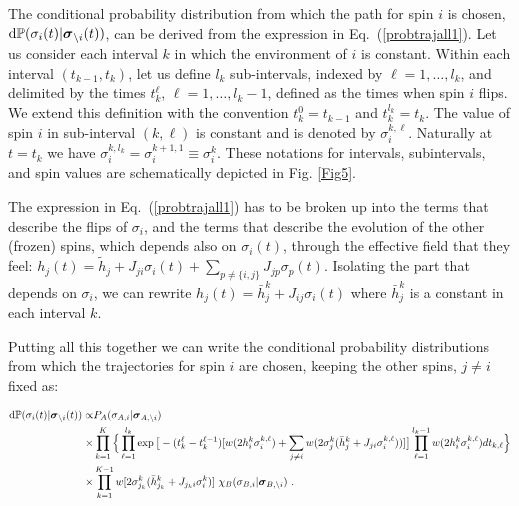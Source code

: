 \documentclass[aps,twocolumn,floats,pre,amsmath,superscriptaddress]{revtex4}
\newcommand{\beq}{\begin{equation}}
\newcommand{\eeq}{\end{equation}}
\newcommand{\<}{\langle}
\renewcommand{\>}{\rangle}
\newcommand{\bs}{ \mbox{\boldmath$\sigma$}}
\begin{document}
The conditional
 probability distribution from which the path for spin $i$ is chosen,
 ${\rm d}\mathbb{P}(\sigma_i(t)|\bs_{\backslash i}(t))$, can be
 derived from the expression in Eq.~(\ref{probtrajall1}).
Let us consider each interval $k$ in which the environment of $i$
is constant. 
Within each interval $(t_{k-1},t_k)$, let us define $l_k$
sub-intervals, indexed by $\ell=1,\ldots,l_k$, and delimited by the times
$t^\ell_k$, $\ell=1,\ldots,l_k-1$, defined as the times when spin $i$ flips. We extend
this definition with the convention $t^0_k=t_{k-1}$ and $t^{l_k}_k=t_k$.
The value of spin $i$ in sub-interval $(k,\ell)$ is constant and is
denoted by $\sigma_i^{k,\ell}$. Naturally at $t=t_k$ we have
$\sigma_i^{k,l_k}=\sigma_i^{k+1,1}\equiv \sigma_i^k $.
These notations for intervals, subintervals, and spin values are schematically depicted in Fig. \ref{Fig5}. 

The expression in  Eq.~(\ref{probtrajall1}) has to be broken up into the terms that describe 
the flips of $\sigma_i$, and the terms that describe the evolution of
the other (frozen) spins, 
which depends also on $\sigma_i(t)$, through the effective field that they feel: 
$h_j(t)=\tilde h_j+J_{ji}\sigma_i(t)+\sum_{p\neq \{i,j\}}J_{jp}
\sigma_p(t)$. Isolating the part that depends on $\sigma_i$,  
we can rewrite $h_j(t) = \bar h_j^k + J_{ij} \sigma_i(t)$ where $\bar h_j^k$ is a constant
in each interval $k$.


Putting all this together we can write the conditional probability distributions from which the trajectories for spin $i$ are chosen, keeping the other spins, $j\neq i$ fixed as:
\begin{widetext}
\beq
\begin{split}
\text{d}\mathbb{P}(\sigma_i(t)|\bs_{\backslash i}(t))\propto &
P_A(\sigma_{A,i} | \bs_{A,\backslash i})
\\ \times &
\prod_{k=1}^K 
\Big\{ \prod_{\ell=1}^{l_k} \exp\big[ -(t^{\ell}_k-t^{\ell-1}_{k})
[ w(2 h_i^k \sigma_i^{k,\ell}) + \sum_{j\neq i} w(2  \sigma_j^{k}(\bar h_{j}^{k} + J_{ji} \sigma^{k,\ell}_i))]
\big]
\prod_{\ell=1}^{l_k-1}w(2h_i^k \sigma_i^{k,\ell}) dt_{k,\ell}
\Big\}
\\  \times &
\prod_{k=1}^{K-1}w[ 2 \sigma_{j_k}^{k} (\bar h_{j_k}^{k} + J_{j_ki} \sigma^{k}_i)  ] \
\chi_B(\sigma_{B,i} | \bs_{B,\backslash i}) \ 
.
\label{condprob1}
\end{split}
\eeq
\end{widetext}
\end{document}
